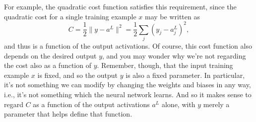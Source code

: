 \documentclass[a4paper,twoside,10pt]{book}
\begin{document}
For example, the quadratic cost function satisfies this requirement, since the quadratic cost for a single training example $x$ may be written as
\begin{equation}
C = \frac{1}{2} \|y-a^L\|^2 = \frac{1}{2} \sum_j (y_j-a^L_j)^2,
\label{eq:27}
\end{equation}
and thus is a function of the output activations. Of course, this cost function also depends on the desired output $y$, and you may wonder why we're not regarding the cost also as a function of $y$. Remember, though, that the input training example $x$ is fixed, and so the output $y$ is also a fixed parameter. In particular, it's not something we can modify by changing the weights and biases in any way, i.e., it's not something which the neural network learns. And so it makes sense to regard $C$ as a function of the output activations $a^L$ alone, with $y$ merely a parameter that helps define that function.
\end{document}
